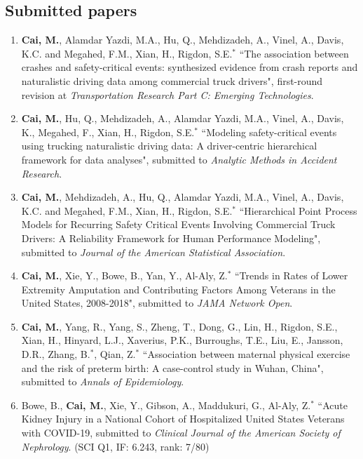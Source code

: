 \documentclass[11pt, a4paper]{article}
\begin{document}
	\subsection*{Submitted papers}
	\begin{enumerate}[leftmargin=0ex,itemsep=1ex]
		\item \textbf{Cai, M.}, Alamdar Yazdi, M.A., Hu, Q., Mehdizadeh, A., Vinel, A., Davis, K.C. and Megahed, F.M., Xian, H., Rigdon, S.E.$^\ast$ ``The association between crashes and safety-critical events: synthesized evidence from crash reports and naturalistic driving data among commercial truck drivers", first-round revision at \emph{Transportation Research Part C: Emerging Technologies}.
		
		\item \textbf{Cai, M.}, Hu, Q., Mehdizadeh, A., Alamdar Yazdi, M.A., Vinel, A., Davis, K., Megahed, F., Xian, H., Rigdon, S.E.$^\ast$ ``Modeling safety-critical events using trucking naturalistic driving data: A driver-centric hierarchical framework for data analyses", submitted to \emph{Analytic Methods in Accident Research}.
		
		\item \textbf{Cai, M.}, Mehdizadeh, A., Hu, Q., Alamdar Yazdi, M.A., Vinel, A., Davis, K.C. and Megahed, F.M., Xian, H., Rigdon, S.E.$^\ast$ ``Hierarchical Point Process Models for Recurring Safety Critical Events Involving Commercial Truck Drivers: A Reliability Framework for Human Performance Modeling", submitted to \emph{Journal of the American Statistical Association}.
		
		\item \textbf{Cai, M.}, Xie, Y., Bowe, B., Yan, Y., Al-Aly, Z.$^\ast$ ``Trends in Rates of Lower Extremity Amputation and Contributing Factors Among Veterans in the United States, 2008-2018", submitted to \emph{JAMA Network Open}.
		
		\item \textbf{Cai, M.}, Yang, R., Yang, S., Zheng, T., Dong, G., Lin, H., Rigdon, S.E., Xian, H., Hinyard, L.J., Xaverius, P.K., Burroughs, T.E., Liu, E., Jansson, D.R., Zhang, B.$^\ast$, Qian, Z.$^\ast$ ``Association between maternal physical exercise and the risk of preterm birth: A case-control study in Wuhan, China", submitted to \emph{Annals of Epidemiology}.
		
		\item Bowe, B., \textbf{Cai, M.}, Xie, Y., Gibson, A., Maddukuri, G., Al-Aly, Z.$^\ast$ ``Acute Kidney Injury in a National Cohort of Hospitalized United States Veterans with COVID-19, submitted to \emph{Clinical Journal of the American Society of Nephrology}. (SCI Q1, IF: 6.243, rank: 7/80)
		

\end{enumerate}
\end{document}
